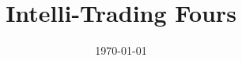 \documentclass[12pt,a4paper]{report}
\title{Intelli-Trading Fours}
\author{}
\date{\today}
\begin{document}
\maketitle

\begin{abstract}
\end{abstract}

\tableofcontents
\clearpage









\end{document}
